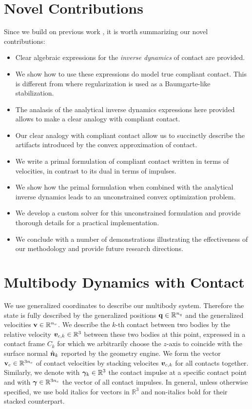 \section{Novel Contributions}

Since we build on previous work \cite{bib:anitescu2006,
bib:anitescu2010,bib:todorov2014}, it is worth summarizing our novel
contributions:
\begin{itemize}
	\item Clear algebraic expressions for the \textit{inverse dynamics} of
	contact are provided.
	\item We show how to use these expressions do model true compliant contact.
	This is different from \cite{bib:todorov2014} where regularization is used
	as a Baumgarte-like stabilization.
	\item The analasis of the analytical inverse dynamics expressions here
	provided allows to make a clear analogy with compliant contact.
	\item Our clear analogy with compliant contact allow us to succinctly
	describe the artifacts introduced by the convex approximation of contact.
	\item We write a primal formulation of compliant contact written in terms of
	velocities, in contrast to its dual in terms of impulses.
	\item We show how the primal formulation when combined with the analytical
	 inverse dynamics leads to an unconstrained convex optimization problem.
	\item We develop a custom solver for this unconstrained formulation and
	provide thorough details for a practical implementation.
	\item We conclude with a number of demonstrations illustrating the
	effectiveness of our methodology and provide future research directions.
\end{itemize}

\section{Multibody Dynamics with Contact}
\label{sec:multibody_dynamics_with_contact}

We use generalized coordinates to describe our multibody system. Therefore the
state is fully described by the generalized positions
${\mathbf{q}}\in\mathbb{R}^{n_q}$ and the generalized velocities
${\mathbf{v}}\in\mathbb{R}^{n_v}$. We describe the $k\text{-th}$ contact between two
bodies by the relative velocity ${\bm{v}}_{c,k}\in\mathbb{R}^3$ between these two
bodies at this point, expressed in a contact frame $C_k$ for which we
arbitrarily choose the $z\text{-axis}$ to coincide with the surface normal
$\hat{{\bm{n}}}_k$ reported by the geometry engine. We form the vector
${\mathbf{v}}_{c}\in\mathbb{R}^{3n_c}$ of contact velocities by stacking velocites
${\bm{v}}_{c,k}$ for all contacts together. Similarly, we denote with
${\bm\gamma}_k\in\mathbb{R}^3$ the contact impulse at a specific contact point and
with ${\bm\gamma}\in\mathbb{R}^{3n_c}$ the vector of all contact impulses. In
general, unless otherwise specified, we use bold italics for vectors in
$\mathbb{R}^3$ and non-italics bold for their stacked counterpart.

